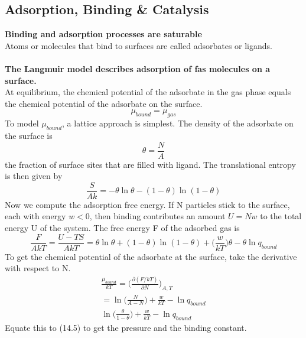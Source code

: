 \documentclass[8pt]{article}
\numberwithin{equation}{section}
\begin{document}
\begin{multicols}{2}
\section{Adsorption, Binding \& Catalysis}
\textbf{Binding and adsorption processes are saturable} \\
Atoms or molecules that bind to surfaces are called adsorbates or ligands. \\\\
\textbf{The Langmuir model describes adsorption of fas molecules on a surface.} \\
At equilibrium, the chemical potential of the adsorbate in the gas phase equals the chemical potential of the adsorbate on the surface.
\begin{equation}
\mu_{bound}=\mu_{gas} \tag{27.1}
\end{equation}
To model $\mu_{bound}$, a lattice approach is simplest. The density of the adsorbate on the surface is 
\begin{equation}
\theta=\frac{N}{A} \tag{27.2}
\end{equation}
the fraction of surface sites that are filled with ligand. The translational entropy is then given by
\begin{equation}
\frac{S}{Ak}=-\theta \ln{\theta}-(1-\theta)\ln{(1-\theta)} \tag{27.4}
\end{equation}
Now we compute the adsorption free energy. If N particles stick to the surface, each with energy $w<0$, then binding contributes an amount $U=Nw$ to the total energy U of the system. The free energy F of the adsorbed gas is 
\begin{equation}
\frac{F}{AkT}=\frac{U-TS}{AkT}=\theta \ln{\theta}+(1-\theta)\ln{(1-\theta)}+\bigg(\frac{w}{kT}\bigg)\theta-\theta\ln{q_{bound}} \tag{27.6}
\end{equation}
To get the chemical potential of the adsorbate at the surface, take the derivative with respect to N. 
\begin{equation}\tag{27.7}
\begin{split}
\frac{\mu_{bound}}{kT}=\bigg(\frac{\partial (F/kT)}{\partial N}\bigg)_{A,T}  \\
=\ln{\bigg(\frac{N}{A-N} \bigg)}+\frac{w}{kT}-\ln{q_{bound}} \\ 
\ln{\bigg(\frac{\theta}{1-\theta} \bigg)}+\frac{w}{kT}-\ln{q_{bound}} 
\end{split}
\end{equation}
Equate this to (14.5) to get the pressure and the binding constant. 
\begin{equation}

\end{equation}
\end{multicols}
\end{document}
